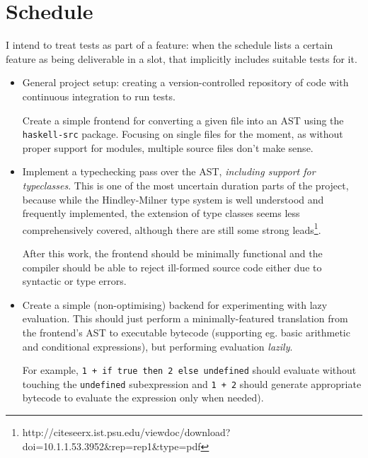 \documentclass[12pt]{article}
\newcommand\haskell[1]{\texttt{#1}}
\newcommand\monospace[1]{\texttt{#1}}
\begin{document}
\section*{Schedule}

I intend to treat tests as part of a feature: when the schedule lists a certain feature as being deliverable in a slot,
that implicitly includes suitable tests for it.




\begin{itemize}
\item
{

    General project setup: creating a version-controlled repository of code with continuous integration to run tests.

    Create a simple frontend for converting a given file into an AST using the \monospace{haskell-src} package. Focusing
    on single files for the moment, as without proper support for modules, multiple source files don't make sense.
}
\item
{

    Implement a typechecking pass over the AST, \textit{including support for typeclasses}. This is one of the most
    uncertain duration parts of the project, because while the Hindley-Milner type system is well understood and
    frequently implemented, the extension of type classes seems less comprehensively covered, although there are still
    some strong leads\footnote{http://citeseerx.ist.psu.edu/viewdoc/download?doi=10.1.1.53.3952\&rep=rep1\&type=pdf}.

    After this work, the frontend should be minimally functional and the compiler should be able to reject ill-formed
    source code either due to syntactic or type errors.
}
\item
{

    Create a simple (non-optimising) backend for experimenting with lazy evaluation. This should just perform a
    minimally-featured translation from the frontend's AST to executable bytecode (supporting eg. basic arithmetic and
    conditional expressions), but performing evaluation \textit{lazily}.

    For example, \haskell{1 + if true then 2 else undefined} should evaluate without touching the \haskell{undefined}
    subexpression and \haskell{1 + 2} should generate appropriate bytecode to evaluate the expression only when needed).
    
}
\end{itemize}
\end{document}
